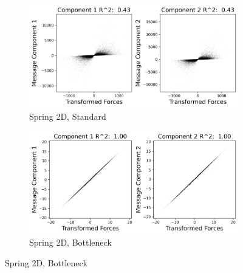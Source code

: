 \documentclass[11pt]{article}
\begin{document}
    \begin{figure}[H]
        \centering
        \begin{subfigure}{0.45\textwidth}
            \includegraphics[width=\textwidth]{figs/spring_2d_standard_r2.png}
            \caption{Spring 2D, Standard}
        \end{subfigure}
        \begin{subfigure}{0.45\textwidth}
            \includegraphics[width=\textwidth]{figs/spring_2d_bottleneck_r2.png}
            \caption{Spring 2D, Bottleneck}
        \end{subfigure}


\end{figure}
\end{document}
